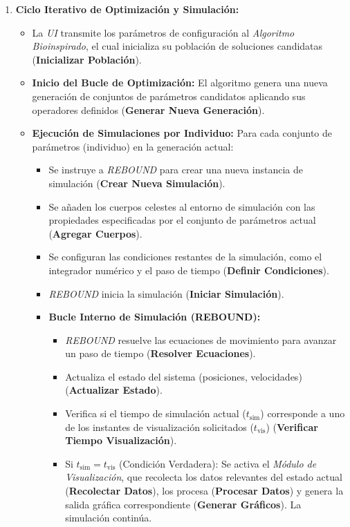 \begin{enumerate}
    \item \textbf{Ciclo Iterativo de Optimización y Simulación:}
        \begin{itemize}
            \item La \textit{UI} transmite los parámetros de configuración al \textit{Algoritmo Bioinspirado}, el cual inicializa su población de soluciones candidatas (\textbf{Inicializar Población}).
            \item \textbf{Inicio del Bucle de Optimización:} El algoritmo genera una nueva generación de conjuntos de parámetros candidatos aplicando sus operadores definidos (\textbf{Generar Nueva Generación}).
            \item \textbf{Ejecución de Simulaciones por Individuo:} Para cada conjunto de parámetros (individuo) en la generación actual:
                \begin{itemize}
                    \item Se instruye a \textit{REBOUND} para crear una nueva instancia de simulación (\textbf{Crear Nueva Simulación}).
                    \item Se añaden los cuerpos celestes al entorno de simulación con las propiedades especificadas por el conjunto de parámetros actual (\textbf{Agregar Cuerpos}).
                    \item Se configuran las condiciones restantes de la simulación, como el integrador numérico y el paso de tiempo (\textbf{Definir Condiciones}).
                    \item \textit{REBOUND} inicia la simulación (\textbf{Iniciar Simulación}).
                    \item \textbf{Bucle Interno de Simulación (REBOUND):}
                        \begin{itemize}
                            \item \textit{REBOUND} resuelve las ecuaciones de movimiento para avanzar un paso de tiempo (\textbf{Resolver Ecuaciones}).
                            \item Actualiza el estado del sistema (posiciones, velocidades) (\textbf{Actualizar Estado}).
                            \item Verifica si el tiempo de simulación actual ($t_{\text{sim}}$) corresponde a uno de los instantes de visualización solicitados ($t_{\text{vis}}$) (\textbf{Verificar Tiempo Visualización}).
                            \item Si $t_{\text{sim}} = t_{\text{vis}}$ (Condición Verdadera): Se activa el \textit{Módulo de Visualización}, que recolecta los datos relevantes del estado actual (\textbf{Recolectar Datos}), los procesa (\textbf{Procesar Datos}) y genera la salida gráfica correspondiente (\textbf{Generar Gráficos}). La simulación continúa.

\end{itemize}
\end{itemize}
\end{itemize}
\end{enumerate}
